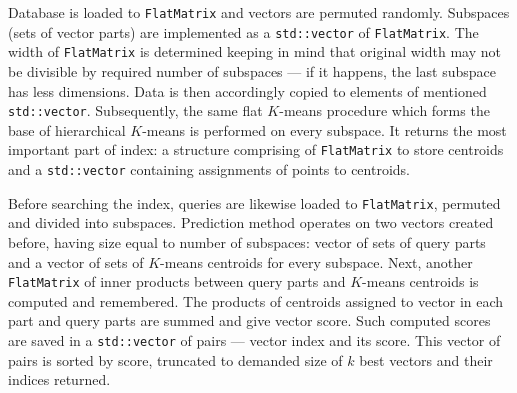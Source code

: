 Database is loaded to \texttt{FlatMatrix} and vectors are permuted randomly.
Subspaces (sets of vector parts) are implemented as a \texttt{std::vector} of \texttt{FlatMatrix}.
The width of \texttt{FlatMatrix} is determined keeping in mind that original width may not be
divisible by required number of subspaces --- if it happens, the last subspace has less dimensions.
Data is then accordingly copied to elements of mentioned \texttt{std::vector}.
Subsequently, the same flat $K$-means procedure which forms the base of hierarchical $K$-means
is performed on every subspace. It returns the most important part of index:
a structure comprising of \texttt{FlatMatrix} to store centroids and a \texttt{std::vector}
containing assignments of points to centroids.

Before searching the index, queries are likewise loaded to \texttt{FlatMatrix}, permuted and divided into subspaces.
Prediction method operates on two vectors created before, having size equal to number of subspaces:
vector of sets of query parts and a vector of sets of $K$-means centroids for every subspace.
Next, another \texttt{FlatMatrix} of inner products between query parts and $K$-means centroids
is computed and remembered.
The products of centroids assigned to vector in each part and query parts are summed and give vector score.
Such computed scores are saved in a \texttt{std::vector} of pairs --- vector index and its score.
This vector of pairs is sorted by score, truncated to demanded size of $k$ best vectors and their indices returned.

